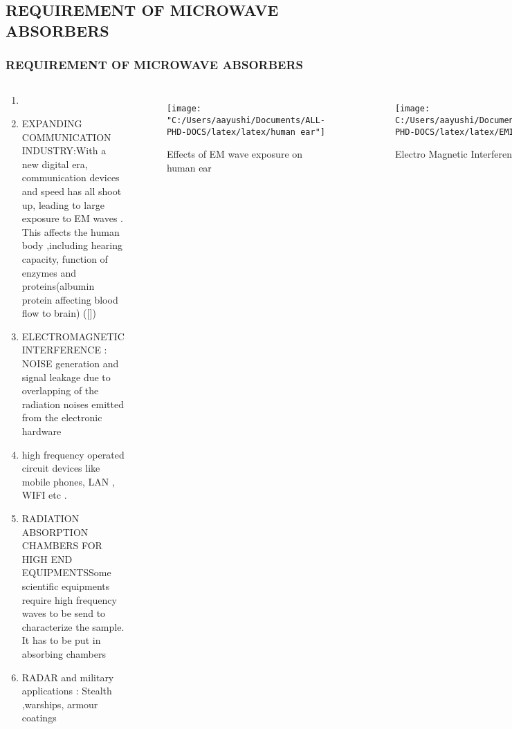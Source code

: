 \documentclass[11pt,aspect ratio=169]{beamer}
\let\oldbib\bibentry
\renewcommand{\bibentry}[1]{{\tiny[\oldbib{#1}]}}
\begin{document}
\subsection{REQUIREMENT OF MICROWAVE ABSORBERS}
	\begin{frame}[t]
		\frametitle{REQUIREMENT OF MICROWAVE ABSORBERS}
		\scriptsize
		\begin{columns}
		\begin{enumerate}[t]
			\item 
			\item EXPANDING COMMUNICATION INDUSTRY:With a new digital era, communication devices and speed has all shoot up, leading to large exposure to EM waves . This affects the human body ,including hearing capacity, function of enzymes and proteins(albumin protein affecting blood flow to brain) ()
			\item ELECTROMAGNETIC INTERFERENCE : NOISE generation and signal leakage due to overlapping of the radiation noises emitted from the electronic hardware
			\item high frequency operated circuit devices like mobile phones, LAN , WIFI etc \cite{r16}.
			\item RADIATION ABSORPTION CHAMBERS FOR HIGH END EQUIPMENTSSome scientific equipments require high frequency waves to be send to characterize the sample. It has to be put in absorbing chambers
			\item RADAR and military applications : Stealth ,warships, armour coatings 
			
		\end{enumerate}
	\begin{figure}[l]
	
		\texttt{[image: "C:/Users/aayushi/Documents/ALL-PHD-DOCS/latex/latex/human ear"]}
		\caption{\small Effects of EM wave exposure on human ear}
		\label{fig:Effects of EM wave exposure on human ear}
	\end{figure}
	\begin{figure}[H]
		\texttt{[image: C:/Users/aayushi/Documents/ALL-PHD-DOCS/latex/latex/EMI]}
		\caption{Electro Magnetic Interference}
		\label{fig:emi}
	\end{figure}
	
		\end{columns}
	\end{frame}
\end{document}
